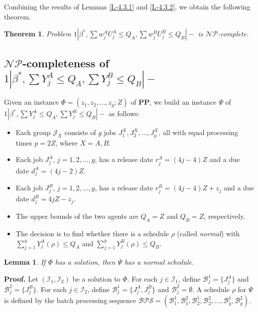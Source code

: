 \documentclass[12pt]{article}
\newtheorem{theorem}{Theorem}[section]
\newtheorem{lemma}{Lemma}[section]
\begin{document}
\begin{sloppypar}
Combining the results of Lemmas \ref{L-4.3.1} and \ref{L-4.3.2}, we obtain the following theorem.
\begin{theorem} \label{T-4.3}
Problem $1 | \beta^{*}, \sum w_j^A U_j^A \leq Q_A, \sum w_j^B U_j^B \leq Q_B|-$ is $\mathcal{NP}$-complete.
\end{theorem}

\subsection{$\mathcal{NP}$-completeness of $1 | \beta^{*}, \sum Y_j^A \leq Q_A, \sum Y_j^B \leq Q_B|-$}

Given an instance $\Phi=(z_1, z_2, \ldots, z_g; Z)$ of $\mathbf{PP}$, we build an
instance $\Psi$ of $1 | \beta^{*}, \sum Y_j^A \leq Q_A, \sum Y_j^B \leq Q_B|-$ as follows:
\begin{itemize}
\item Each group $\mathcal{J}_X$ consists of $g$ jobs $J_1^X, J_2^X, \ldots, J_{g}^X$, all with equal processing times $p=2Z$, where $X =A, B$. 

\item Each job $J_j^A$, $j=1, 2, \ldots, g$, has a release date $r_j^A=(4j-4) Z$ and a due date $d_j^A=(4j-2)Z$.

\item Each job $J_j^B$, $j=1, 2, \ldots, g$, has a release date $r_j^B=(4j-4) Z+z_j$ and a due date $d_j^B=4jZ-z_j$.

\item The upper bounds of the two agents are $Q_A=Z$ and $Q_B=Z$, respectively.

\item The decision is to find whether there is a schedule $\rho$ (called \emph{normal}) with $\sum_{j=1}^g Y_j^A(\rho) \leq Q_A$ and $\sum_{j=1}^g Y_j^B(\rho) \leq Q_B$. 
\end{itemize}

\begin{lemma} \label{L-4.5.1}
If $\Phi$ has a solution, then $\Psi$ has a normal schedule.
\end{lemma}
\noindent \textbf{Proof.} Let $(\mathcal{I}_1, \mathcal{I}_2)$ be a solution to $\Phi$.
For each $j \in \mathcal{I}_1$, define $\mathcal{B}_j^1=\{J_j^A\}$ and $\mathcal{B}_j^2=\{J_j^B\}$.
For each $j \in \mathcal{I}_2$, define $\mathcal{B}_j^1=\{J_j^A, J_j^B\}$ and $\mathcal{B}_j^2=\emptyset$.
A schedule $\rho$ for $\Psi$ is defined by the batch processing sequence
$\mathcal{BPS}=(\mathcal{B}_1^1, \mathcal{B}_1^2, \mathcal{B}_2^1, \mathcal{B}_2^2,\ldots,
\mathcal{B}_{g}^1,\mathcal{B}_{g}^2)$.


\end{sloppypar}
\end{document}
